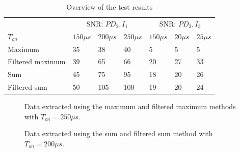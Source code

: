 \begin{table}[]
	\centering
	\label{SNR_results}
\begin{tabular}{l|lll|lll|}
	& \multicolumn{3}{c|}{SNR: $PD_2, I_1$} & \multicolumn{3}{c|}{SNR: $PD_3, I_3$} \\
	$T_{on}$         & $150 \mu s$ & $200\mu s$ & $250\mu s$ & $150\mu s$  & $20\mu s$  & $25\mu s$  \\ \hline
	Maximum          & 35          & 38         & 40         & 5           & 5          & 5          \\
	Filtered maximum & 39          & 65         & 66         & 20          & 27         & 33         \\
	Sum              & 45          & 75         & 95         & 18          & 20         & 26         \\
	Filtered sum     & 50          & 105        & 100        & 19          & 20         & 24        
\end{tabular}
	\caption{Overview of the test results}
\end{table}




\begin{figure}
	\centering     %
	\label{fig:SimpleFeatures}
	\caption{Data extracted using the maximum and filtered maximum methods with $T_{on} = 250\mu s$.}
\end{figure}

\begin{figure}
	\centering     %
	\label{fig:complexFeatures}
	\caption{Data extracted using the sum and filtered sum method with $T_{on} = 200\mu s$.}
\end{figure}

